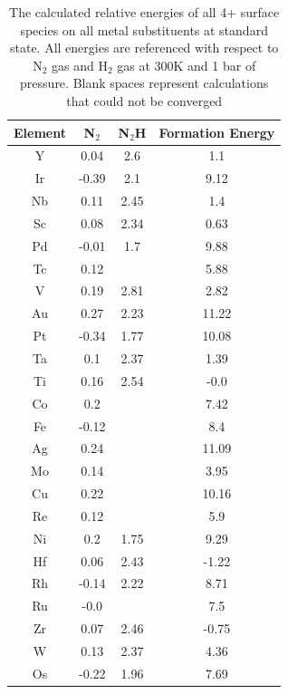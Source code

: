 \documentclass[journal=jacsat,manuscript=article]{achemso}
\begin{document}
\begin{table}
\begin{center}
\begin{tabular}{| c | c | c | c |}
\hline
Element & N$_2$ & N$_2$H & Formation Energy \\
\hline
Y & 0.04 & 2.6 & 1.1 \\
Ir & -0.39 & 2.1 & 9.12 \\
Nb & 0.11 & 2.45 & 1.4 \\
Sc & 0.08 & 2.34 & 0.63 \\
Pd & -0.01 & 1.7 & 9.88 \\
Tc & 0.12 &  & 5.88 \\
V & 0.19 & 2.81 & 2.82 \\
Au & 0.27 & 2.23 & 11.22 \\
Pt & -0.34 & 1.77 & 10.08 \\
Ta & 0.1 & 2.37 & 1.39 \\
Ti & 0.16 & 2.54 & -0.0 \\
Co & 0.2 &  & 7.42 \\
Fe & -0.12 &  & 8.4 \\
Ag & 0.24 &  & 11.09 \\
Mo & 0.14 &  & 3.95 \\
Cu & 0.22 &  & 10.16 \\
Re & 0.12 &  & 5.9 \\
Ni & 0.2 & 1.75 & 9.29 \\
Hf & 0.06 & 2.43 & -1.22 \\
Rh & -0.14 & 2.22 & 8.71 \\
Ru & -0.0 &  & 7.5 \\
Zr & 0.07 & 2.46 & -0.75 \\
W & 0.13 & 2.37 & 4.36 \\
Os & -0.22 & 1.96 & 7.69 \\
\hline
\end{tabular}
\end{center}
\label{table:4+_energies}
\caption{The calculated relative energies of all 4+ surface species on all metal substituents at standard state. All energies are referenced with respect to N$_2$ gas and H$_2$ gas at 300K and 1 bar of pressure. Blank spaces represent calculations that could not be converged}
\end{table}
\end{document}
